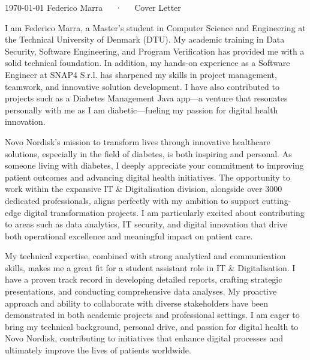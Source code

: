 \documentclass[11pt, a4paper]{awesome-cv}
\begin{document}
\makecvheader[R]

\makecvfooter
  {\today}
  {Federico Marra~~~·~~~Cover Letter}
  {}

\makelettertitle

\begin{cvletter}

I am Federico Marra, a Master’s student in Computer Science and Engineering at the Technical University of Denmark (DTU). My academic training in Data Security, Software Engineering, and Program Verification has provided me with a solid technical foundation. In addition, my hands-on experience as a Software Engineer at SNAP4 S.r.l. has sharpened my skills in project management, teamwork, and innovative solution development. I have also contributed to projects such as a Diabetes Management Java app—a venture that resonates personally with me as I am diabetic—fueling my passion for digital health innovation.

Novo Nordisk’s mission to transform lives through innovative healthcare solutions, especially in the field of diabetes, is both inspiring and personal. As someone living with diabetes, I deeply appreciate your commitment to improving patient outcomes and advancing digital health initiatives. The opportunity to work within the expansive IT \& Digitalisation division, alongside over 3000 dedicated professionals, aligns perfectly with my ambition to support cutting-edge digital transformation projects. I am particularly excited about contributing to areas such as data analytics, IT security, and digital innovation that drive both operational excellence and meaningful impact on patient care.

My technical expertise, combined with strong analytical and communication skills, makes me a great fit for a student assistant role in IT \& Digitalisation. I have a proven track record in developing detailed reports, crafting strategic presentations, and conducting comprehensive data analyses. My proactive approach and ability to collaborate with diverse stakeholders have been demonstrated in both academic projects and professional settings. I am eager to bring my technical background, personal drive, and passion for digital health to Novo Nordisk, contributing to initiatives that enhance digital processes and ultimately improve the lives of patients worldwide.

\end{cvletter}

\makeletterclosing
\end{document}
